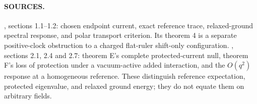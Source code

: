 \paragraph*{SOURCES.}
\begingroup\footnotesize
{},
sections 1.1--1.2: chosen endpoint current, exact reference trace,
relaxed-ground spectral response, and polar transport criterion.
Its theorem 4 is a separate positive-clock obstruction to a charged
flat-ruler shift-only configuration.
,
sections 2.1, 2.4 and 2.7: theorem E's complete protected-current
null, theorem F's loss of protection under a vacuum-active added
interaction, and the $O(q^2)$ response at a homogeneous reference.
These distinguish reference expectation, protected eigenvalue, and
relaxed ground energy; they do not equate them on arbitrary fields.
\endgroup
